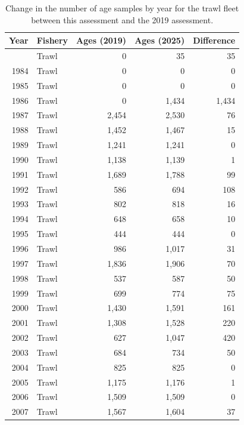 \documentclass[
  english,
]{article}
\begin{document}
\endgroup

\pagebreak

\begingroup
\fontsize{9.0pt}{11.0pt}\selectfont

\begin{longtable}{rlrrr}

\caption{\label{tbl-twl-age-samples-comp}Change in the number of age
samples by year for the trawl fleet between this assessment and the 2019
assessment.}

\tabularnewline

\toprule
Year & Fishery & Ages (2019) & Ages (2025) & Difference \\ 
\midrule\addlinespace[2.5pt]
1983 & Trawl & 0 & 35 & 35 \\ 
1984 & Trawl & 0 & 0 & 0 \\ 
1985 & Trawl & 0 & 0 & 0 \\ 
1986 & Trawl & 0 & 1,434 & 1,434 \\ 
1987 & Trawl & 2,454 & 2,530 & 76 \\ 
1988 & Trawl & 1,452 & 1,467 & 15 \\ 
1989 & Trawl & 1,241 & 1,241 & 0 \\ 
1990 & Trawl & 1,138 & 1,139 & 1 \\ 
1991 & Trawl & 1,689 & 1,788 & 99 \\ 
1992 & Trawl & 586 & 694 & 108 \\ 
1993 & Trawl & 802 & 818 & 16 \\ 
1994 & Trawl & 648 & 658 & 10 \\ 
1995 & Trawl & 444 & 444 & 0 \\ 
1996 & Trawl & 986 & 1,017 & 31 \\ 
1997 & Trawl & 1,836 & 1,906 & 70 \\ 
1998 & Trawl & 537 & 587 & 50 \\ 
1999 & Trawl & 699 & 774 & 75 \\ 
2000 & Trawl & 1,430 & 1,591 & 161 \\ 
2001 & Trawl & 1,308 & 1,528 & 220 \\ 
2002 & Trawl & 627 & 1,047 & 420 \\ 
2003 & Trawl & 684 & 734 & 50 \\ 
2004 & Trawl & 825 & 825 & 0 \\ 
2005 & Trawl & 1,175 & 1,176 & 1 \\ 
2006 & Trawl & 1,509 & 1,509 & 0 \\ 
2007 & Trawl & 1,567 & 1,604 & 37 \\ 

\end{longtable}
\end{document}
